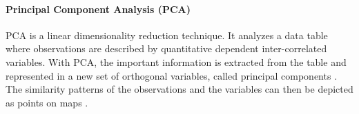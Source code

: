 \documentclass[conference]{IEEEtran}
\begin{document}

\paragraph{Principal Component Analysis (PCA)} PCA is a linear dimensionality reduction technique. It analyzes a data table where observations are described by quantitative dependent inter-correlated variables. With PCA, the important information is extracted from the table and represented in a new set of orthogonal variables, called principal components \cite{bro2014principal}. The similarity patterns of the observations and the variables can then be depicted as points on maps \cite{abdi2010principal}.



\end{document}
